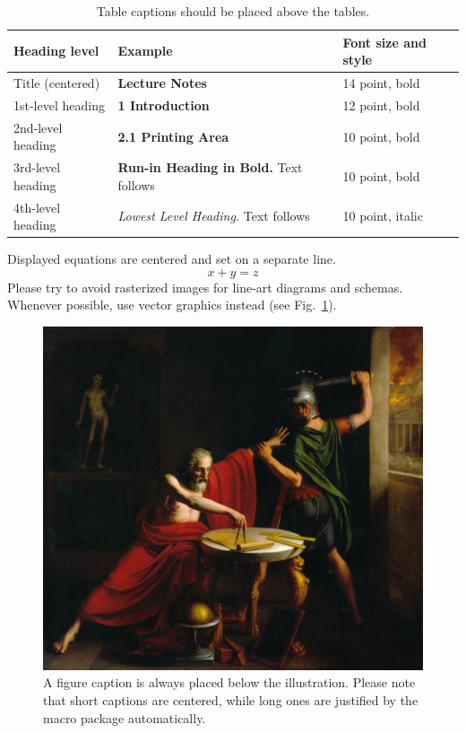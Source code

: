 \documentclass[runningheads]{llncs}
\begin{document}
\begin{table}
\caption{Table captions should be placed above the
tables.}\label{tab1}
\begin{tabular}{|l|l|l|}
\hline
Heading level &  Example & Font size and style\\
\hline
Title (centered) &  {\Large\bfseries Lecture Notes} & 14 point, bold\\
1st-level heading &  {\large\bfseries 1 Introduction} & 12 point, bold\\
2nd-level heading & {\bfseries 2.1 Printing Area} & 10 point, bold\\
3rd-level heading & {\bfseries Run-in Heading in Bold.} Text follows & 10 point, bold\\
4th-level heading & {\itshape Lowest Level Heading.} Text follows & 10 point, italic\\
\hline
\end{tabular}
\end{table}


\noindent Displayed equations are centered and set on a separate
line.
\begin{equation}
x + y = z
\end{equation}
Please try to avoid rasterized images for line-art diagrams and
schemas. Whenever possible, use vector graphics instead (see
Fig.~\ref{fig1}).

\begin{figure}
\includegraphics[width=\textwidth]{fig1.jpg}
\caption{A figure caption is always placed below the illustration.
Please note that short captions are centered, while long ones are
justified by the macro package automatically.} \label{fig1}
\end{figure}
\end{document}
